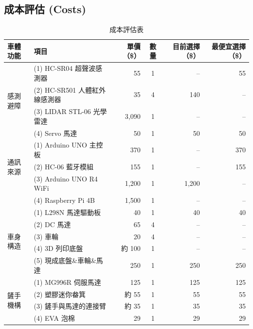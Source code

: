 \documentclass[12pt]{article}
\begin{document}
\subsection{成本評估 (Costs)}
\begin{table}[H]
  \centering
  \caption{成本評估表}
  \label{tab:costs}
  \scriptsize
  \setlength{\tabcolsep}{3pt}
  \renewcommand{\arraystretch}{0.95}
  \begin{tabularx}{\linewidth}{l X r c r r}
    \toprule
    車體功能 & 項目 & 單價（\$） & 數量 & 目前選擇（\$） & 最便宜選擇（\$）\\
    \midrule
    \multirow{4}{*}{感測避障}
      & (1) HC-SR04 超聲波感測器            & 55  & 1 & -- & 55\\
      & (2) HC-SR501 人體紅外線感測器        & 35  & 4 & 140 & -- \\
      & (3) LIDAR STL-06 光學雷達           & 3{,}090 & 1 & -- & -- \\ 
      & (4) Servo 馬達                     & 50  & 1 & 50 & 50 \\
    \midrule
    \multirow{3}{*}{通訊來源}
      & (1) Arduino UNO 主控板             & 370  & 1 & -- & 370\\
      & (2) HC-06 藍牙模組                 & 155  & 1 & -- & 155\\
      & (3) Arduino UNO R4 WiFi           & 1{,}200 & 1 & 1{,}200 & -- \\
      & (4) Raspberry Pi 4B              & 1{,}500 & 1 & -- & --\\
    \midrule
    \multirow{5}{*}{車身構造}
      & (1) L298N 馬達驅動板                & 40 & 1 & 40 & 40\\
      & (2) DC 馬達                        & 65 & 4 & -- & --\\
      & (3) 車輪                           & 20 & 4 & -- & --\\
      & (4) 3D 列印底盤                     & 約 100 & 1 & -- & --\\
      & (5) 現成底盤\&車輪\&馬達             & 250 & 1 & 250 & 250\\
    \midrule
    \multirow{4}{*}{鏟手機構} 
      & (1) MG996R 伺服馬達             & 125 & 1 & 125 & 125\\
      & (2) 塑膠迷你畚箕                 & 約 55 & 1 & 55 & 55\\
      & (3) 鏟手與馬達的連接臂              & 約 35 & 1 & 35 & 35\\
      & (4) EVA 泡棉                    & 29 & 1 & 29 & 29\\
    \midrule

\end{tabularx}
\end{table}
\end{document}
